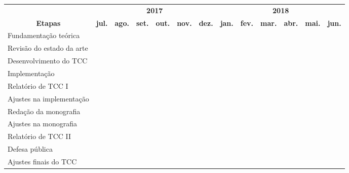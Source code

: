 \documentclass[11pt]{letter}
\begin{document}
\begin{center}
  \begin{tabular}{|p{4.04cm}|*{12}{c|}}
    \hline & \multicolumn{6}{c|}{\textbf{2017}}
      & \multicolumn{6}{c|}{\textbf{2018}} \\ \cline{2-13}
    \multicolumn{1}{|c|}{\multirow{-2}{*}{\textbf{Etapas}}}
      & \textbf{jul.} & \textbf{ago.} & \textbf{set.}
      & \textbf{out.} & \textbf{nov.} & \textbf{dez.}
      & \textbf{jan.} & \textbf{fev.} & \textbf{mar.}
      & \textbf{abr.} & \textbf{mai.} & \textbf{jun.} \\
    \hline Fundamentação teórica
      & \cellcolor{lightgray} & & & & & & & & & & & \\
    \hline Revisão do estado da arte
      & \cellcolor{lightgray} & \cellcolor{lightgray} & & & & & & & & & & \\
      \hline Desenvolvimento do TCC
      & & \cellcolor{lightgray} & \cellcolor{lightgray}
      & \cellcolor{lightgray} & & & & & & & & \\
    \hline Implementação
      & & & & \cellcolor{lightgray} & \cellcolor{lightgray}
      & \cellcolor{lightgray} & & & & & & \\
    \hline Relatório de TCC I
      & & & & & \cellcolor{lightgray} & & & & & & & \\
    \hline Ajustes na implementação
      & & & & & & & \cellcolor{lightgray} & & & & & \\
    \hline Redação da monografia
      & & & & & & & \cellcolor{lightgray} & \cellcolor{lightgray}
      & \cellcolor{lightgray} & & & \\
    \hline Ajustes na monografia
      & & & & & & & & & \cellcolor{lightgray} & \cellcolor{lightgray} & & \\
    \hline Relatório de TCC II
      & & & & & & & & & & & \cellcolor{lightgray} & \\
    \hline Defesa pública
      & & & & & & & & & & & & \cellcolor{lightgray} \\
    \hline Ajustes finais do TCC
      & & & & & & & & & & & & \cellcolor{lightgray} \\
    \hline
  \end{tabular}

  \vspace*{\fill}
\end{center}
\end{document}

